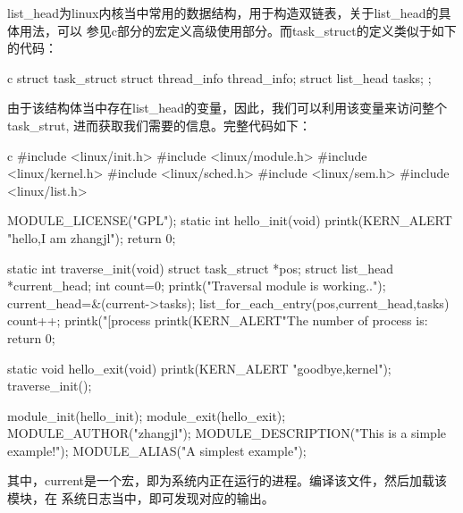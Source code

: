 list\_head为linux内核当中常用的数据结构，用于构造双链表，关于list\_head的具体用法，可以
参见c部分的宏定义高级使用部分。而task\_struct的定义类似于如下的代码：
\begin{code-block}{c}
struct task_struct {
        struct thread_info    thread_info;
        struct list_head      tasks;
};
\end{code-block}

由于该结构体当中存在list\_head的变量，因此，我们可以利用该变量来访问整个task\_strut,
进而获取我们需要的信息。完整代码如下：
\begin{code-block}{c}
#include <linux/init.h>
#include <linux/module.h>
#include <linux/kernel.h>
#include <linux/sched.h>
#include <linux/sem.h>
#include <linux/list.h>

MODULE_LICENSE("GPL");
static int hello_init(void)
{
        printk(KERN_ALERT "hello,I am zhangjl\n");
        return 0;
}

static int traverse_init(void)
{
       struct task_struct *pos;
       struct list_head *current_head;
       int count=0;
       printk("Traversal module is working..\n");
       current_head=&(current->tasks);
       list_for_each_entry(pos,current_head,tasks)
       {
              count++;
              printk("[process %
       }
       printk(KERN_ALERT"The number of process is:%
       return 0;
}

static void hello_exit(void)
{
    printk(KERN_ALERT "goodbye,kernel\n");
    traverse_init();
}

module_init(hello_init);
module_exit(hello_exit);
MODULE_AUTHOR("zhangjl");
MODULE_DESCRIPTION("This is a simple example!\n");
MODULE_ALIAS("A simplest example");

\end{code-block}

其中，current是一个宏，即为系统内正在运行的进程。编译该文件，然后加载该模块，在
系统日志当中，即可发现对应的输出。



